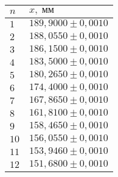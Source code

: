 \begin{tabular}{|l|l|}
\hline
$n$ & $x,\;\text{мм}$\\\hline
$1$ & $189{,}9000 \pm 0{,}0010$\\\hline
$2$ & $188{,}0550 \pm 0{,}0010$\\\hline
$3$ & $186{,}1500 \pm 0{,}0010$\\\hline
$4$ & $183{,}5000 \pm 0{,}0010$\\\hline
$5$ & $180{,}2650 \pm 0{,}0010$\\\hline
$6$ & $174{,}4000 \pm 0{,}0010$\\\hline
$7$ & $167{,}8650 \pm 0{,}0010$\\\hline
$8$ & $161{,}8100 \pm 0{,}0010$\\\hline
$9$ & $158{,}4650 \pm 0{,}0010$\\\hline
$10$ & $156{,}0550 \pm 0{,}0010$\\\hline
$11$ & $153{,}9460 \pm 0{,}0010$\\\hline
$12$ & $151{,}6800 \pm 0{,}0010$\\\hline
\end{tabular}
